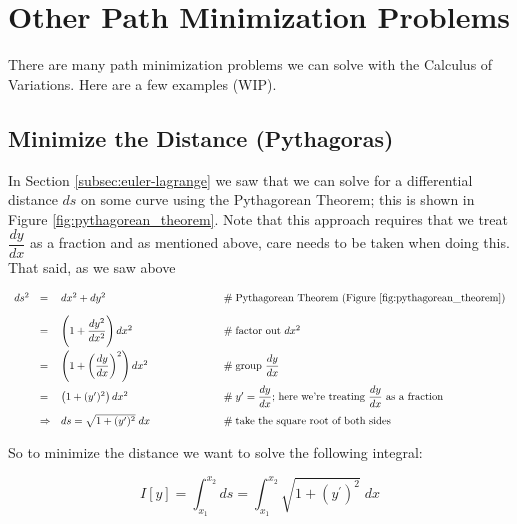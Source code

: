 \documentclass{article}
\theoremstyle{definition}
\begin{document}
\section{Other Path Minimization Problems}
There are many path minimization problems we can solve with the
Calculus of Variations. Here are a few examples (WIP).

\subsection{Minimize the Distance (Pythagoras)}
{ In Section \ref{subsec:euler-lagrange} we saw
that we can solve for a differential distance $ds$ on some curve
using the Pythagorean Theorem; this is shown in Figure
\ref{fig:pythagorean_theorem}. Note that this approach requires
that we treat $\dfrac{dy}{dx}$ as a fraction and as mentioned
above, care needs to be taken when doing this. That said, as we
saw above \par}



\begin{equation*}
\begin{array}{lllll}
ds^2
&=& dx^2 + dy^2   												&\qquad \qquad \qquad \mathrel{\#} \text{Pythagorean Theorem (Figure \ref{fig:pythagorean_theorem})} \\
[10pt]
&=& \left ( 1 + \dfrac{dy^2}{dx^2} \right ) dx^2				&\qquad \qquad \qquad \mathrel{\#} \text{factor out $dx^2$} \\
[12pt]
&=& \left ( 1 + \left (\dfrac{dy}{dx} \right )^2 \right ) dx^2	&\qquad \qquad \qquad \mathrel{\#} \text{group $\dfrac{dy}{dx}$} \\
[12pt]
&=& \left ( 1 + (y^{\prime})^2 \right ) dx^2					&\qquad \qquad \qquad \mathrel{\#} \text{$y^{\prime} = \dfrac{dy}{dx}$; here we're treating $\dfrac{dy}{dx}$ as a fraction}\\
[10pt]
&\Rightarrow& ds = \sqrt{1 + (y^{\prime})^2} \; dx				&\qquad \qquad \qquad \mathrel{\#} \text{take the square root of both sides}
\end{array}
\end{equation*}


\bigskip
\noindent
So to minimize the distance we want to solve the following integral: 

\bigskip
\begin{equation*}
I[y] = \int_{x_1}^{x_2} ds = \int_{x_1}^{x_2} \sqrt{1 + (y^{\prime})^2} \; dx
\end{equation*}	
\end{document}
